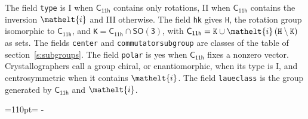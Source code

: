 \documentclass[10pt,a4paper]{article}
\makeatletter
\def\grouprule#1#2{\noalign{\marks\LTgroupmarks{\the\belowrulesep}\nobreak\vskip#1%
  \vskip\aboverulesep}\multispan\LT@cols\unskip{\leaders\hrule\@height#2\hfill\kern\z@}\cr
  \noalign{\penalty\LTrulebreak\vskip\belowrulesep\global\@lastruleclass\z@}}
\newcommand{\needspace}[1]{\par\penalty-100\begingroup\dimen0=#1\relax\dimen2=\pagegoal
  \advance\dimen2-\pagetotal\ifdim\dimen0>\dimen2\relax\ifdim\dimen2>0pt\vfil\break\fi\fi
  \endgroup}
\numberwithin{equation}{section}
\newcommand{\eltfont}[1]{{\let\sigma\eltsigma\mathelt{#1}}}
\newcommand{\grp}[1]{\mathsf{#1}}
\newcommand{\elt}[1]{\eltfont{#1}}
\newcommand{\hmname}[1]{#1}
\newcommand{\orbname}[1]{#1}
\newcommand{\conwayname}[1]{#1}
\newcommand{\igname}[1]{#1}
\newcommand{\olivename}[1]{#1}
\makeatother
\begin{document}
{}
\leavevmode\label{n:element.inversion}The field \texttt{type} is I when $\grp{C_{11h}}$ contains only rotations, II when $\grp{C_{11h}}$ contains the inversion $\elt{i}$ and III otherwise. The field \texttt{hk} gives \texttt{H}, the rotation group isomorphic to $\grp{C_{11h}}$, and \texttt{K}${} = \grp{C_{11h}} \cap \grp{SO(3)}$, with $\grp{C_{11h}} = \texttt{K} \cup \elt{i}\,(\texttt{H} \setminus \texttt{K})$ as sets. The fields \texttt{center} and \texttt{commutatorsubgroup} are classes of the table of section~\ref{s:subgroups}. The field \texttt{polar} is yes when $\grp{C_{11h}}$ fixes a nonzero vector. Crystallographers call a group chiral, or enantiomorphic, when its type is I, and centrosymmetric when it contains $\elt{i}$. The field \texttt{laueclass} is the group generated by $\grp{C_{11h}}$ and $\elt{i}$.
\needspace{110pt}
\end{document}
